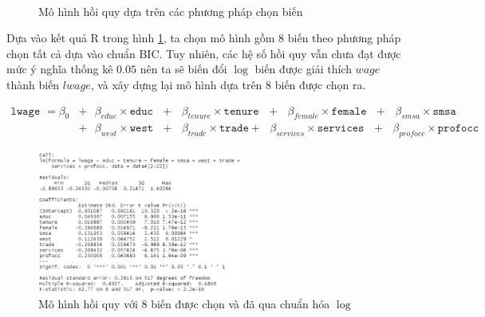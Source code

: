 \begin{figure}[H]
	\centering
	\\
	\caption{Mô hình hồi quy dựa trên các phương pháp chọn biến}
	\label{5-model-reg}
\end{figure}
Dựa vào kết quả R trong hình \ref{5-model-reg}, ta chọn mô hình gồm 8 biến theo phương pháp chọn tất cả dựa vào chuẩn BIC. Tuy nhiên, các hệ số hồi quy vẫn chưa đạt được mức ý nghĩa thống kê $0.05$ nên ta sẽ biến đổi $\log$ biến được giải thích $wage$ thành biến $lwage$, và xây dựng lại mô hình dựa trên 8 biến được chọn ra.

\begin{equation*}
	\begin{split}
		\texttt{lwage } = \beta_0 &+ \text{ } \beta_{educ}\times \texttt{educ} \text{ } + \text{ } \beta_{tenure} \times \texttt{tenure} \text{ }+\text{ }\beta_{female} \times \texttt{female} \text{ }
		+\text{ }\beta_{smsa} \times\texttt{smsa}\text{ }  \\
		&+ \text{ }\beta_{west} \times \texttt{west} \text{ } 
		+ \text{ }\beta_{trade}\times \texttt{trade} + \text{ }\beta_{services} \times \texttt{services} \text{ } + \text{ }\beta_{profocc}\times \texttt{profocc}
	\end{split}
\end{equation*}


\begin{figure}[H]
	\centering
	\includegraphics[width=0.6\textwidth]{../Photo Of Result/model-final-4}
	\caption{Mô hình hồi quy với 8 biến được chọn và đã qua chuẩn hóa $\log$}
	\label{model-final-4}
\end{figure}

